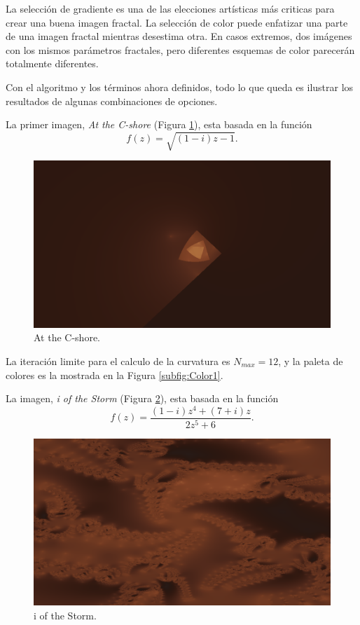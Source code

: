 \documentclass[12pt,letterpaper,final]{article}
\theoremstyle{plain}
\theoremstyle{definition}
\theoremstyle{remark}
\numberwithin{equation}{section}
\begin{document}
La selección de gradiente es una de las elecciones artísticas más criticas para crear una buena imagen fractal. La selección de color puede enfatizar una parte de una imagen fractal mientras desestima otra. En casos extremos, dos imágenes con los mismos parámetros fractales, pero diferentes esquemas de color parecerán totalmente diferentes.

Con el algoritmo y los términos ahora definidos, todo lo que queda es ilustrar los resultados de algunas combinaciones de opciones.

La primer imagen, \textit{At the C-shore} (Figura \ref{fig:At the C-shore}), esta basada en la función 
\[ f(z) = \sqrt{(1-i)z-1}. \]

\begin{figure}[!hbtp]
\centering
\includegraphics[scale=0.5]{../src/curvature_estimation/A_the_C-shore/results/A_the_C-shore_12_960x540.png}
\caption{At the C-shore.}
\label{fig:At the C-shore}
\end{figure}

La iteración limite para el calculo de la curvatura es $N_{max} = 12$, y la paleta de colores es la mostrada en la Figura \ref{subfig:Color1}. \vspace{24pt}

\newpage
La imagen, \textit{i of the Storm} (Figura \ref{fig:i of the Storm}), esta basada en la función 
\[ f(z) = \frac{(1-i)z^4 + (7+i)z}{2z^5 + 6}. \]

\begin{figure}[!hbtp]
\centering
\includegraphics[scale=0.5]{../src/curvature_estimation/i_of_the_Storm/results/i_of_the_Storm_12_960x540.png} 
\caption{i of the Storm.}
\label{fig:i of the Storm}
\end{figure}
\end{document}
